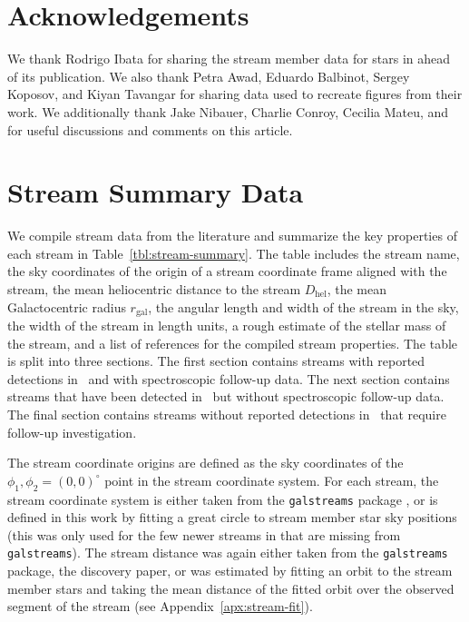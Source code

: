 \documentclass[final,5p,times,twocolumn,authoryear]{elsarticle}
\begin{document}
\section*{Acknowledgements}

We thank Rodrigo Ibata for sharing the stream member data for stars in
\citet{ibata:2023} ahead of its publication.
We also thank Petra Awad, Eduardo Balbinot, Sergey Koposov, and Kiyan Tavangar for
sharing data used to recreate figures from their work.
We additionally thank Jake Nibauer, Charlie Conroy, Cecilia Mateu, and 
for useful discussions and comments on this article.


\appendix

\section{Stream Summary Data}
\label{apx:stream-summary}

We compile stream data from the literature and summarize the key properties of each
stream in Table~\ref{tbl:stream-summary}.
The table includes the stream name, the sky coordinates of the origin of a stream
coordinate frame aligned with the stream, the mean heliocentric distance to the stream
$D_\textrm{hel}$, the mean Galactocentric radius $r_{\textrm{gal}}$, the angular length
and width of the stream in the sky, the width of the stream in length units, a rough
estimate of the stellar mass of the stream, and a list of references for the compiled
stream properties.
The table is split into three sections.
The first section contains streams with reported detections in \gaia\ and with
spectroscopic follow-up data.
The next section contains streams that have been detected in \gaia\ but without
spectroscopic follow-up data.
The final section contains streams without reported detections in \gaia\ that require
follow-up investigation.

The stream coordinate origins are defined as the sky coordinates of the $\phi_1, \phi_2
= (0, 0)^\circ$ point in the stream coordinate system.
For each stream, the stream coordinate system is either taken from the
\texttt{galstreams} package \citep{mateu:2023}, or is defined in this work by fitting a
great circle to stream member star sky positions (this was only used for the few newer
streams in \citet{ibata:2023} that are missing from \texttt{galstreams}).
The stream distance was again either taken from the \texttt{galstreams} package, the
discovery paper, or was estimated by fitting an orbit to the stream member stars and
taking the mean distance of the fitted orbit over the observed segment of the stream
(see Appendix~\ref{apx:stream-fit}).
\end{document}
